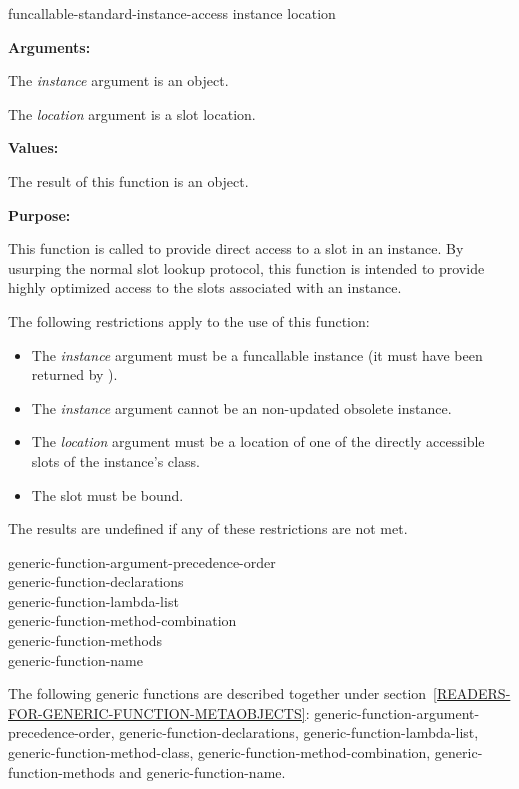 \begin{defun}[Function]
funcallable-standard-instance-access instance location

\textbf{Arguments:}

The \emph{instance} argument is an object.

The \emph{location} argument is a slot location.

\textbf{Values:}

The result of this function is an object.

\textbf{Purpose:}

This function is called to provide direct access to a slot in an instance. By
usurping the normal slot lookup protocol, this function is intended to provide
highly optimized access to the slots associated with an instance.

The following restrictions apply to the use of this function:

\begin{itemize}
\item The \emph{instance} argument must be a funcallable instance (it must have
  been returned by ).
\item The \emph{instance} argument cannot be an non-updated obsolete instance.
\item The \emph{location} argument must be a location of one of the directly
  accessible slots of the instance's class.
\item The slot must be bound.
\end{itemize}

The results are undefined if any of these restrictions are not met.
\end{defun}

\begin{defun}
generic-function-argument-precedence-order \\
generic-function-declarations \\
generic-function-lambda-list \\
generic-function-method-combination \\
generic-function-methods \\
generic-function-name

The following generic functions are described together under
section~\ref{READERS-FOR-GENERIC-FUNCTION-METAOBJECTS}:
generic-function-argument-precedence-order,
generic-function-declarations, generic-function-lambda-list,
generic-function-method-class, generic-function-method-combination,
generic-function-methods and generic-function-name.
\end{defun}

